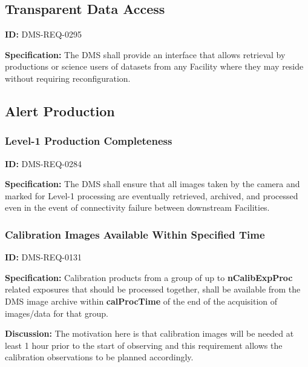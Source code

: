 \documentclass[SE,toc,lsstdraft]{lsstdoc}
\begin{document}
\subsection{Transparent Data Access}

\label{DMS-REQ-0295}
\textbf{ID:} DMS-REQ-0295

\textbf{Specification:} The DMS shall provide an interface that allows retrieval by productions or science users of datasets from any Facility where they may reside without requiring reconfiguration.







\subsection{Alert Production}





\subsubsection{Level-1 Production Completeness}

\label{DMS-REQ-0284}
\textbf{ID:} DMS-REQ-0284

\textbf{Specification:} The DMS shall ensure that all images taken by the camera and marked for Level-1 processing are eventually retrieved, archived, and processed even in the event of connectivity failure between downstream Facilities.






\subsubsection{Calibration Images Available Within Specified Time}

\label{DMS-REQ-0131}
\textbf{ID:} DMS-REQ-0131

\textbf{Specification:} Calibration products from a group of up to \textbf{nCalibExpProc} related exposures that should be processed together, shall be available from the DMS image archive within \textbf{calProcTime} of the end of the acquisition of images/data for that group.

\textbf{Discussion: }The motivation here is that calibration images will be needed at least 1 hour prior to the start of observing and this requirement allows the calibration observations to be planned accordingly.
\end{document}
